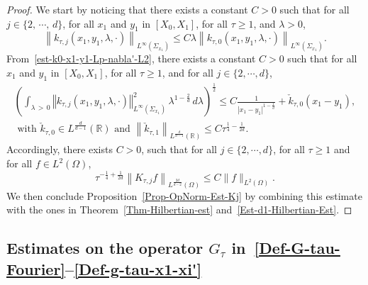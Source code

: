 \documentclass[AHL,Unicode,longabstracts]{cedram}
\newcommand*\R{\mathbb{R}}
\newcommand{\norm}[1]{\left\Vert#1\right\Vert}
\renewcommand{\leq}{\leqslant}
\renewcommand{\geq}{\geqslant}
\begin{document}
\begin{proof}
We start by noticing that there exists a constant $C >0$ such that for all $j \in \{2, \,\cdots,\,d\}$, for all $x_1$ and $y_1$ in $[X_0, X_1]$, for all $\tau \geq 1$, and $\lambda >0$,
\begin{equation*}\label{Est-k-tau-j-x1-y1}
\left\| k_{\tau, j}(x_1,y_1,\lambda, \cdot) \right\|_{L^\infty\left(\Sigma_{x_1}\right)}
\leq C \lambda \left\| k_{\tau, 0}(x_1,y_1,\lambda, \cdot) \right\|_{L^\infty\left(\Sigma_{x_1}\right)}.
\end{equation*}
From~\eqref{est-k0-x1-y1-Lp-nabla'-L2}, there exists a constant $C >0$ such that for all $x_1$ and $y_1$ in $[X_0, X_1]$, for all $\tau \geq 1$, and for all $j \in \{2, \cdots, d\}$,
\begin{multline}\label{est-kj-x1-y1-Lp-L2}
\left(\int_{\lambda\,>\,0} \norm{k_{\tau,j}(x_1, y_1,\lambda, \cdot) }^2_{L^\infty(\Sigma_{x_1})} \, \lambda^{1 -\frac{2}{d}}\, d\lambda\right)^{\frac{1}{2}}
\leq C\frac{1}{|x_1-y_1|^{1-\frac{1}{d}}} + \check k_{\tau,0}(x_1-y_1),
\\
\text{ with }\check k_{\tau,0} \in L^{\frac{d}{d-1}} (\R)\text{ and }
\left\|\check k_{\tau,1}\right\|_{L^{\frac{d}{d-1}} (\R)} \leq C \tau^{\frac{1}{4}-\frac{1}{2d}}.
\end{multline}
Accordingly, there exists $C>0$, such that for all $j \in \{2, \cdots, d\}$, for all $\tau \geq 1$ and for all $f \in L^2(\Omega)$,
\begin{equation*}
\tau^{-\frac{1}{4}+\frac{1}{2d}} \left\| K_{\tau,j} f\right\|_{L^{\frac{2d}{d-2}}(\Omega)}
\leq C \| f \|_{L^2(\Omega)}.
\end{equation*}
We then conclude Proposition~\ref{Prop-OpNorm-Est-Kj} by combining this estimate with the ones in Theorem~\ref{Thm-Hilbertian-est} and~\eqref{Est-d1-Hilbertian-Est}.
\end{proof}


\subsection{Estimates on the operator \texorpdfstring{$G_\tau$}{G tau} in~\eqref{Def-G-tau-Fourier}--\eqref{Def-g-tau-x1-xi'}}
\end{document}
